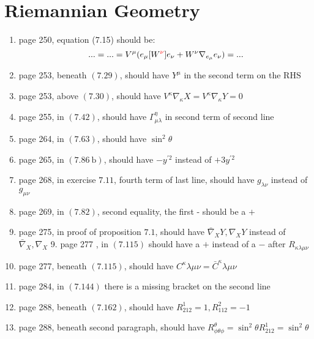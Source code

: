 \documentclass{article}
\newcommand\Dag{\textsuperscript{\dagger}}
\begin{document}
\section*{Riemannian Geometry}

\begin{enumerate}
\item page 250\Dag, equation (7.15) should be:
  \[... = ... = V^\mu(e_\mu[W^{\color{red} \nu}]e_\nu+W^\nu\nabla_{e_\mu}e_\nu) = ...\]
  
\item page 253, beneath $(7.29)$, should have $Y^{\mu}$ in the second term on the $\mathrm{RHS}$

\item page 253, above $(7.30)$, should have $V^{\kappa} \nabla_{\kappa} X=V^{\kappa} \nabla_{\kappa} Y=0$

\item page 255, in $(7.42)$, should have $\Gamma_{\mu \lambda}^{\eta}$ in second term of second line

\item page 264, in $(7.63)$, should have $\sin ^{2} \theta$

\item page 265, in $(7.86 \mathrm{~b})$, should have $-y^{\prime 2}$ instead of $+3 y^{\prime 2}$

\item page 268, in exercise $7.11$, fourth term of last line, should have $g_{\lambda \nu}$ instead of $g_{\mu \nu}$

\item page 269, in $(7.82)$, second equality, the first - should be a $+$

\item page 275, in proof of proposition $7.1$, should have $\bar{\nabla}_{X} Y, \nabla_{X} Y$ instead of $\bar{\nabla}_{X}, \nabla_{X}$ 9. page 277 , in $(7.115)$ should have a $+$ instead of a $-$ after $R_{\kappa \lambda \mu \nu}$

\item page 277, beneath $(7.115)$, should have $C^{\kappa} \lambda \mu \nu=\bar{C}^{\kappa} \lambda \mu \nu$

\item page 284, in $(7.144)$ there is a missing bracket on the second line

\item page 288, beneath $(7.162)$, should have $R_{212}^{1}=1, R_{112}^{2}=-1$

\item page 288, beneath second paragraph, should have $R_{\phi \theta \phi}^{\theta}=\sin ^{2} \theta R_{212}^{1}=\sin ^{2} \theta$


\end{enumerate}
\end{document}
